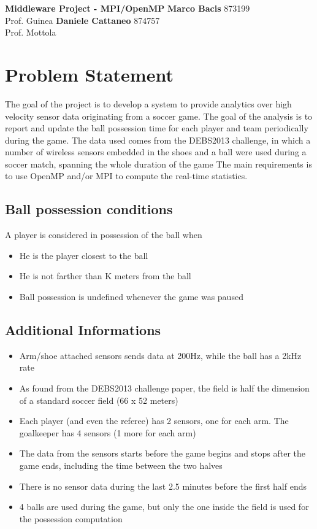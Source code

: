 \documentclass[a4paper, 10pt]{article}
\begin{document}
\noindent
\large\textbf{Middleware Project - MPI/OpenMP} \hfill \textbf{Marco Bacis} 873199 \\
Prof. Guinea \hfill \textbf{Daniele Cattaneo} 874757 \\
Prof. Mottola

\section*{Problem Statement}
The goal of the project is to develop a system to provide analytics over high velocity sensor data originating from a soccer game.
The goal of the analysis is to report and update the ball possession time for each player and team periodically during the game.
The data used comes from the DEBS2013 challenge, in which a number of wireless sensors embedded in the shoes and a ball were used during a soccer match, spanning the whole duration of the game
The main requirements is to use OpenMP and/or MPI to compute the real-time statistics.

\subsection*{Ball possession conditions}
A player is considered in possession of the ball when
\begin{itemize}
\item He is the player closest to the ball
\item He is not farther than K meters from the ball
\item Ball possession is undefined whenever the game was paused
\end{itemize}

\subsection*{Additional Informations}
\begin{itemize}
    \item Arm/shoe attached sensors sends data at 200Hz, while the ball has a 2kHz rate
    \item As found from the DEBS2013 challenge paper, the field is half the dimension of a standard soccer field (66 x 52 meters)
    \item Each player (and even the referee) has 2 sensors, one for each arm. The goalkeeper has 4 sensors (1 more for each arm)
    \item The data from the sensors starts before the game begins and stops after the game ends, including the time between the two halves
    \item There is no sensor data during the last 2.5 minutes before the first half ends
    \item 4 balls are used during the game, but only the one inside the field is used for the possession computation
\end{itemize}
\end{document}
